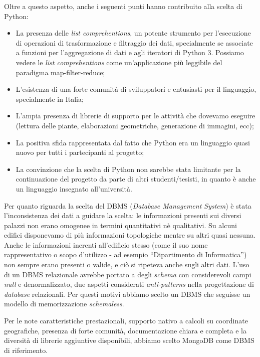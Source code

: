 \documentclass[12pt]{report}
\begin{document}
Oltre a questo aspetto, anche i seguenti punti hanno contribuito
alla scelta di Python:
\begin{itemize}
  \item La presenza delle \textit{list comprehentions}, un potente
strumento per l'esecuzione di operazioni di trasformazione e
filtraggio dei dati, specialmente se associate a funzioni per
l'aggregazione di dati e agli iteratori di Python 3. Possiamo vedere
le \textit{list comprehentions} come un'applicazione più leggibile del
paradigma map-filter-reduce;
  \item L'esistenza di una forte comunità di sviluppatori e entusiasti
per il linguaggio, specialmente in Italia;
  \item L'ampia presenza di librerie di supporto per le attività che
dovevamo eseguire (lettura delle piante, elaborazioni geometriche,
generazione di immagini, ecc);
  \item La positiva sfida rappresentata dal fatto che Python era un linguaggio
  quasi nuovo per tutti i partecipanti al progetto;
  \item La convinzione che la scelta di Python non sarebbe stata limitante per 
  la continuazione del progetto da parte di altri studenti/tesisti, in quanto è
anche un linguaggio insegnato all'università.
\end{itemize}

Per quanto riguarda la scelta del DBMS (\textit{Database Management
System}) è stata l'inconsistenza dei dati a guidare la scelta: le
informazioni presenti sui diversi palazzi non erano omogenee in
termini quantitativi nè qualitativi. Su alcuni edifici disponevamo di
più informazioni topologiche mentre su altri quasi nessuna. Anche le
informazioni inerenti all'edificio stesso (come il suo nome rappresentativo o
scopo d'utilizzo - ad esempio ``Dipartimento di Informatica'') non sempre
erano presenti o valide, e ciò si ripeteva anche sugli altri dati. L'uso di un
DBMS relazionale avrebbe portato a degli \textit{schema} con considerevoli
campi \textit{null} e denormalizzato, due aspetti considerati
\textit{anti-patterns} nella progettazione di \textit{database} relazionali.
Per questi motivi abbiamo scelto un DBMS che seguisse un modello di
memorizzazione \textit{schemaless}. 

Per le note caratteristiche prestazionali, supporto nativo a calcoli
su coordinate geografiche, presenza di forte comunità, documentazione
chiara e completa e la diversità di librerie aggiuntive disponibili,
abbiamo scelto MongoDB come DBMS di riferimento.
\end{document}
